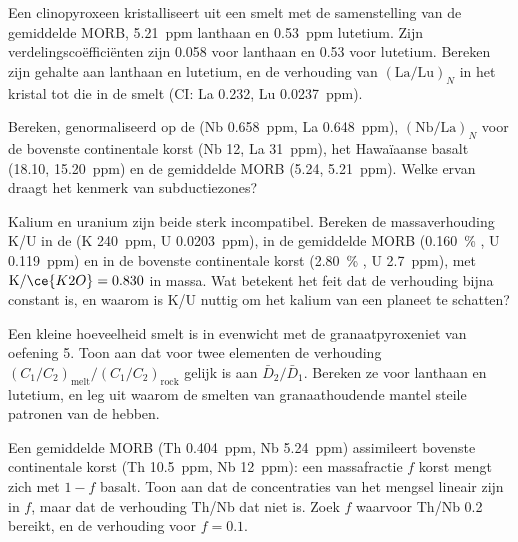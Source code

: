 \begin{exercise}[$\star\star$]\label{exo:b2:elements-in-the-earth:7}
Een clinopyroxeen kristalliseert uit een smelt met de samenstelling van de gemiddelde MORB,
\qty{5.21}{ppm} lanthaan en \qty{0.53}{ppm} lutetium. Zijn verdelingscoëfficiënten
zijn 0.058 voor lanthaan en 0.53 voor lutetium. Bereken zijn
gehalte aan lanthaan en lutetium, en de verhouding van $(\mathrm{La}/\mathrm{Lu})_N$
in het kristal tot die in de smelt (CI: La 0.232, Lu \qty{0.0237}{ppm}).
\end{exercise}

\begin{exercise}[$\star\star$]\label{exo:b2:elements-in-the-earth:8}
Bereken, genormaliseerd op de  (Nb \qty{0.658}{ppm}, La \qty{0.648}{ppm}),
$(\mathrm{Nb}/\mathrm{La})_N$ voor de bovenste continentale korst (Nb 12,
La \qty{31}{ppm}), het Hawaïaanse basalt (18.10, \qty{15.20}{ppm}) en de gemiddelde MORB
(5.24, \qty{5.21}{ppm}). Welke ervan draagt het kenmerk van subductiezones?
\end{exercise}

\begin{exercise}[$\star\star$]\label{exo:b2:elements-in-the-earth:9}
Kalium en uranium zijn beide sterk incompatibel. Bereken de massaverhouding K/U in
de  (K \qty{240}{ppm}, U \qty{0.0203}{ppm}), in de gemiddelde MORB
(\qty{0.160}{\percent} , U \qty{0.119}{ppm}) en in de bovenste continentale
korst (\qty{2.80}{\percent} , U \qty{2.7}{ppm}), met
$\mathrm{K}/\ce{K2O} = 0.830$ in massa. Wat betekent het feit dat de verhouding bijna constant is,
en waarom is K/U nuttig om het kalium van een planeet te schatten?
\end{exercise}

\begin{exercise}[$\star\star\star$]\label{exo:b2:elements-in-the-earth:10}
Een kleine hoeveelheid smelt is in evenwicht met de granaatpyroxeniet van oefening
5. Toon aan dat voor twee elementen de verhouding
$(C_1/C_2)_{\mathrm{melt}}/(C_1/C_2)_{\mathrm{rock}}$ gelijk is aan
$\bar D_2/\bar D_1$. Bereken ze voor lanthaan en lutetium, en leg uit waarom de
smelten van granaathoudende mantel steile patronen van de  hebben.
\end{exercise}

\begin{exercise}[$\star\star\star$]\label{exo:b2:elements-in-the-earth:11}
Een gemiddelde MORB (Th \qty{0.404}{ppm}, Nb \qty{5.24}{ppm}) assimileert bovenste
continentale korst (Th \qty{10.5}{ppm}, Nb \qty{12}{ppm}): een massafractie $f$
korst mengt zich met $1-f$ basalt. Toon aan dat de concentraties van het mengsel
lineair zijn in $f$, maar dat de verhouding Th/Nb dat niet is. Zoek $f$ waarvoor Th/Nb
0.2 bereikt, en de verhouding voor $f = 0.1$.
\end{exercise}

